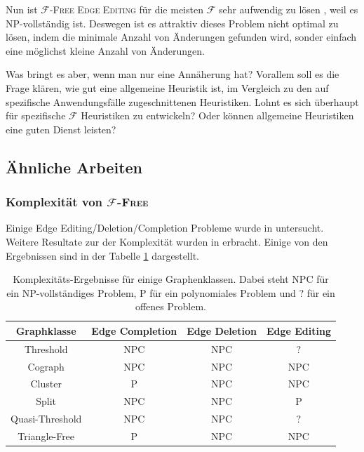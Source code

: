 \documentclass[12pt,a4paper,onecolumn,oneside,titlepage]{article}
\newcommand\cursive[1]{\ensuremath{\mathcal{#1}}}
\begin{document}
Nun ist \textsc{\cursive{F}-Free Edge Editing} für die meisten \cursive{F} sehr aufwendig zu lösen \cite{Burzyn06}, weil es NP-vollständig ist. 
Deswegen ist es attraktiv dieses Problem nicht optimal zu lösen, indem die minimale Anzahl von Änderungen gefunden wird, sonder einfach eine möglichst kleine Anzahl von Änderungen.

Was bringt es aber, wenn man nur eine Annäherung hat?  Vorallem soll es die Frage klären, wie gut eine allgemeine Heuristik ist, im Vergleich zu den auf spezifische Anwendungsfälle zugeschnittenen Heuristiken. Lohnt es sich überhaupt für spezifische \cursive{F} Heuristiken zu entwickeln? Oder können allgemeine Heuristiken eine guten Dienst leisten? 

\subsection{Ähnliche Arbeiten}
\subsubsection{Komplexität von \textsc{\cursive{F}-Free}}
Einige Edge Editing/Deletion/Completion Probleme wurde in \cite{Natanzon01} untersucht. Weitere Resultate zur der Komplexität wurden in \cite{Burzyn06} erbracht.
Einige von den Ergebnissen sind in der Tabelle \ref{tab:hardness} dargestellt. 

\begin{table}

\centering

\begin{tabular}{c ccc}
\textbf{Graphklasse} & \textbf{Edge Completion} & \textbf{Edge Deletion} & \textbf{Edge Editing} \\ 
\hline 
Threshold & NPC & NPC & ? \\
Cograph & NPC & NPC & NPC \\
Cluster & P & NPC & NPC \\
Split & NPC & NPC & P \\
Quasi-Threshold & NPC & NPC & ? \\
Triangle-Free & P & NPC & NPC \\
\end{tabular} 
\caption{Komplexitäts-Ergebnisse für einige Graphenklassen. Dabei steht NPC für ein NP-vollständiges Problem, P für ein polynomiales Problem und ? für ein offenes Problem.}
\label{tab:hardness}
\end{table}
\end{document}
